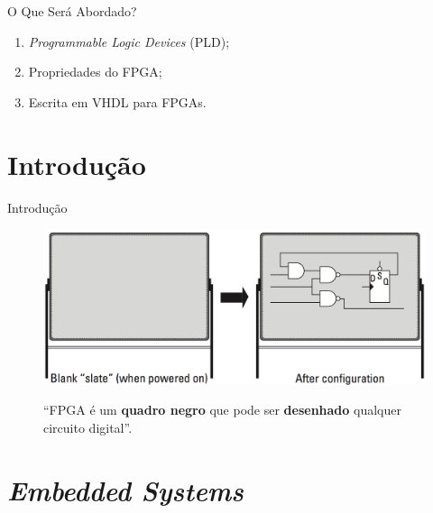 \documentclass[aspectratio=169]{beamer}
\begin{document}
	\begin{frame}{O Que Será Abordado?}
		\begin{enumerate}
			\item \textit{Programmable Logic Devices} (PLD);
			\item Propriedades do FPGA;
			\item Escrita em VHDL para FPGAs.
		\end{enumerate}
	\end{frame}

\section{Introdução}
	\begin{frame}{Introdução}
		
		\begin{figure}[h]
			\centering
			\caption{``FPGA é um \textbf{quadro negro} que pode ser \textbf{desenhado} qualquer circuito digital''.}
			\includegraphics[height=0.7\textheight]{img/print/quadro.png}
			\label{fig:quadro}
		\end{figure}
	\end{frame}
	
	
\section{\it{Embedded Systems}}
\end{document}
